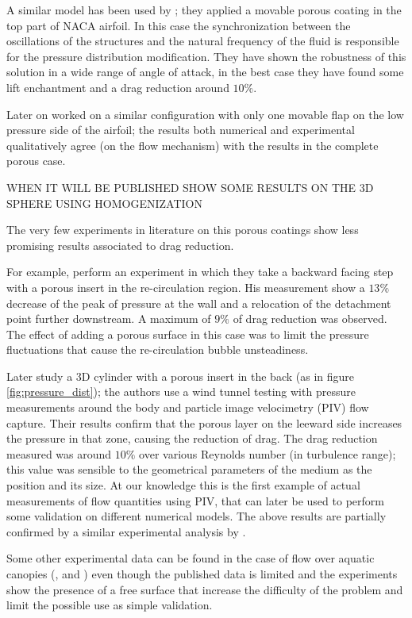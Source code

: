 A similar model has been used by \citet{venkataraman2012numerical}; they applied a movable porous coating in the top part of NACA airfoil.
In this case the synchronization between the oscillations of the structures and the natural frequency of the fluid is responsible for the pressure distribution modification.
They have shown the robustness of this solution in a wide range of angle of attack, in the best case they have found some lift enchantment and a drag reduction around $10\%$.

Later on \citet{rosti2017pelskin} worked on a similar configuration with only one movable flap on the low pressure side of the airfoil; the results both numerical and experimental qualitatively agree (on the flow mechanism) with the results in the complete porous case.

WHEN IT WILL BE PUBLISHED SHOW SOME RESULTS ON THE 3D SPHERE USING HOMOGENIZATION \citet{zampogna2017new}

The very few experiments in literature on this porous coatings show less promising results associated to drag reduction.

For example, \citet{heenan1998passive} perform an experiment in which they take a backward facing step with a porous insert in the re-circulation region.
His measurement show a $13\%$ decrease of the peak of pressure at the wall and a relocation of the detachment point further downstream.
A maximum of $9\%$ of drag reduction was observed.
The effect of adding a porous surface in this case was to limit the pressure fluctuations that cause the re-circulation bubble unsteadiness.

Later \citet{klausmann2017drag} study a 3D cylinder with a porous insert in the back (as in figure \ref{fig:pressure_dist}); the authors use a wind tunnel testing with pressure measurements around the body and particle image velocimetry (PIV) flow capture.
Their results confirm that the porous layer on the leeward side increases the pressure in that zone, causing the reduction of drag.
The drag reduction measured was around $10\%$ over various Reynolds number (in turbulence range); this value was sensible to the geometrical parameters of the medium as the position and its size.
At our knowledge this is the first example of actual measurements of flow quantities using PIV, that can later be used to perform some validation on different numerical models.
The above results are partially confirmed by a similar experimental analysis by \citet{grizzetti2015esperimenti}.

Some other experimental data can be found in the case of flow over aquatic canopies (\citet{zhang2011exchange}, \citet{segalini2011experimental} and \citet{hamed2017impact}) even though the published data is limited and the experiments show the presence of a free surface that increase the difficulty of the problem and limit the possible use as simple validation.

